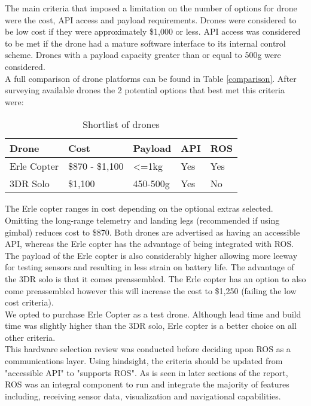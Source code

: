 \documentclass[capstone_report.tex]{subfiles}
\begin{document}
The main criteria that imposed a limitation on the number of options for drone were the cost, API access and payload requirements.  Drones were considered to be low cost if they were approximately \$1,000 or less. API access was considered to be met if the drone had a mature software interface to its internal control scheme. Drones with a payload capacity greater than or equal to 500g were considered.\\

A full comparison of drone platforms can be found in Table \ref{comparison}.  After surveying available drones the 2 potential options that best met this criteria were:

\begin{table}[H]
\centering
\begin{tabular}{@{}lllll@{}}
\toprule
Drone       & Cost          & Payload       & API & ROS \\ \midrule
Erle Copter & \$870 - \$1,100 & \textless=1kg & Yes & Yes \\
3DR Solo    & \$1,100       & 450-500g      & Yes & No  \\ \bottomrule
\end{tabular}
\caption{Shortlist of drones\label{eligible_drones}}
\end{table}

The Erle copter ranges in cost depending on the optional extras selected. Omitting the long-range telemetry and landing legs (recommended if using gimbal) reduces cost to \$870. Both drones are advertised as having an accessible API, whereas the Erle copter has the advantage of being integrated with ROS.\\

The payload of the Erle copter is also considerably higher allowing more leeway for testing sensors and resulting in less strain on battery life.  The advantage of the 3DR solo is that it comes preassembled. The Erle copter has an option to also come preassembled however this will increase the cost to \$1,250 (failing the low cost criteria).\\

We opted to purchase Erle Copter as a test drone.  Although lead time and build time was slightly higher than the 3DR solo, Erle copter is a better choice on all other criteria.\\

This hardware selection review was conducted before deciding upon ROS as a communications layer. Using hindsight, the criteria should be updated from "accessible API" to "supports ROS". As is seen in later sections of the report, ROS was an integral component to run and integrate the majority of features including, receiving sensor data, visualization and navigational capabilities.
\end{document}
